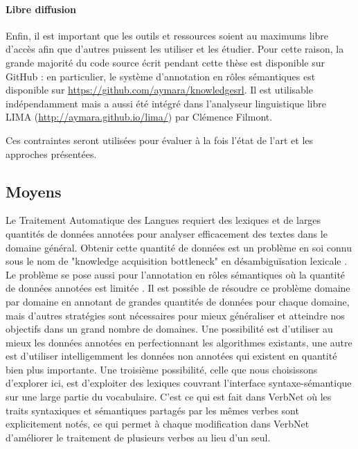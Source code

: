 \paragraph{Libre diffusion} Enfin, il est important que les outils et
ressources soient au maximums libre d'accès afin que d'autres puissent les
utiliser et les étudier. Pour cette raison, la grande majorité du code source
écrit pendant cette thèse est disponible sur GitHub : en particulier, le
système d'annotation en rôles sémantiques est disponible sur
\url{https://github.com/aymara/knowledgesrl}. Il est utilisable indépendamment
mais a aussi été intégré dans l'analyseur linguistique libre LIMA
(\url{http://aymara.github.io/lima/}) par Clémence Filmont.

Ces contraintes seront utilisées pour évaluer à la fois l'état de l'art et les
approches présentées.

\subsection{Moyens}
\label{objectifs_these}


Le Traitement Automatique des Langues requiert des lexiques et de larges
quantités de données annotées pour analyser efficacement des textes dans le
domaine général. Obtenir cette quantité de données est un problème en soi connu
sous le nom de "knowledge acquisition bottleneck" en désambiguïsation lexicale
\citep{gale1992method,navigli2009word}. Le problème se pose aussi pour
l'annotation en rôles sémantiques où la quantité de données annotées est
limitée \citep[section 1]{das2012structure}. Il est possible de résoudre ce
problème domaine par domaine en annotant de grandes quantités de données pour
chaque domaine, mais d'autres stratégies sont nécessaires pour mieux
généraliser et atteindre nos objectifs dans un grand nombre de domaines. Une
possibilité est d'utiliser au mieux les données annotées en perfectionnant les
algorithmes existants, une autre est d'utiliser intelligemment les données non
annotées qui existent en quantité bien plus importante. Une troisième
possibilité, celle que nous choisissons d'explorer ici, est d'exploiter des
lexiques couvrant l'interface syntaxe-sémantique sur une large partie du
vocabulaire. C'est ce qui est fait dans VerbNet où les traits syntaxiques et
sémantiques partagés par les mêmes verbes sont explicitement notés, ce qui
permet à chaque modification dans VerbNet d'améliorer le traitement de
plusieurs verbes au lieu d'un seul.

